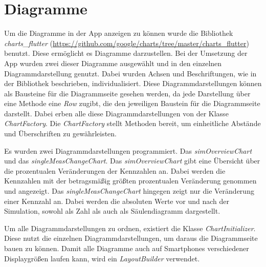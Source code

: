 	\section{Diagramme}
	\label{sec:charts}
	Um die Diagramme in der App anzeigen zu können wurde die Bibliothek \textit{charts\_flutter} (\url{https://github.com/google/charts/tree/master/charts_flutter}) benutzt. Diese ermöglicht es Diagramme darzustellen. Bei der Umsetzung der App wurden zwei dieser Diagramme ausgewählt und in den einzelnen Diagrammdarstellung genutzt. Dabei wurden Achsen und Beschriftungen, wie in der Bibliothek beschrieben, individualisiert. Diese Diagrammdarstellungen können als Bausteine für die Diagrammseite gesehen werden, da jede Darstellung über eine Methode eine \textit{Row} zugibt, die den jeweiligen Baustein für die Diagrammseite darstellt. Dabei erben alle diese Diagrammdarstellungen von der Klasse \textit{ChartFactory}. Die \textit{ChartFactory} stellt Methoden bereit, um einheitliche Abstände und Überschriften zu gewährleisten.
	
	Es wurden zwei Diagrammdarstellungen programmiert. Das \textit{simOverviewChart} und das \textit{singleMeasChangeChart}. Das \textit{simOverviewChart} gibt eine Übersicht über die prozentualen Veränderungen der Kennzahlen an. Dabei werden die Kennzahlen mit der betragsmäßig größten prozentualen Veränderung genommen und angezeigt.
	Das \textit{singleMeasChangeChart} hingegen zeigt nur die Veränderung einer Kennzahl an. Dabei werden die absoluten Werte vor und nach der Simulation, sowohl als Zahl als auch als Säulendiagramm dargestellt.
	
	Um alle Diagrammdarstellungen zu ordnen, existiert die Klasse \textit{ChartInitializer}. Diese nutzt die einzelnen Diagrammdarstellungen, um daraus die Diagrammseite bauen zu können. Damit alle Diagramme auch auf Smartphones verschiedener Displaygrößen laufen kann, wird ein \textit{LayoutBuilder} verwendet. 